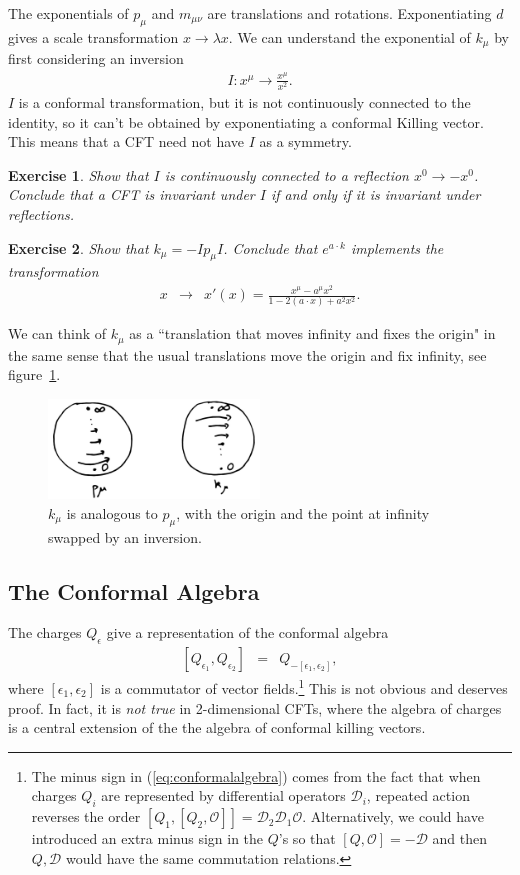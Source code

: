 \documentclass[11pt]{ws-rv9x6}
\newcommand\be{\begin{eqnarray}}
\newcommand\ee{\end{eqnarray}}
\newcommand\cO{\mathcal{O}}
\newcommand\e\epsilon
\newcommand\<\langle
\renewcommand\>\rangle
\renewcommand\.{\cdot}
\newcommand\cD{\mathcal{D}}
\newtheorem{exercise}{Exercise}[section]
\begin{document}
The exponentials of $p_\mu$ and $m_{\mu\nu}$ are translations and rotations. Exponentiating $d$ gives a scale transformation $x\to \lambda x$.  
We can understand the exponential of $k_\mu$ by first considering an inversion
\be
I:x^\mu \to \frac{x^\mu}{x^2}.
\ee
$I$ is a conformal transformation, but it is not continuously connected to the identity, so it can't be obtained by exponentiating a conformal Killing vector. This means that a CFT need not have $I$ as a symmetry.
\begin{exercise}
Show that $I$ is continuously connected to a reflection $x^0\to -x^0$.  Conclude that a CFT is invariant under $I$ if and only if it is invariant under reflections.
\end{exercise}

\begin{exercise}
Show that $k_\mu = -I p_\mu I$. Conclude that $e^{a\.k}$ implements the transformation
\be
\label{eq:finitespecialconformal}
x &\to& x'(x)=\frac{x^\mu-a^\mu x^2}{1-2(a\.x)+a^2 x^2}.
\ee
\end{exercise}
We can think of $k_\mu$ as a ``translation that moves infinity and fixes the origin" in the same sense that the usual translations move the origin and fix infinity, see figure~\ref{fig:translationnearinfinity}.

\begin{figure}
\begin{center}
\includegraphics[width=0.5\textwidth]{translationnearinfinity.jpg}
\end{center}
\caption{\label{fig:translationnearinfinity} $k_\mu$ is analogous to $p_\mu$, with the origin and the point at infinity swapped by an inversion.}
\end{figure}

\subsection{The Conformal Algebra}

The charges $Q_\e$ give a representation of the conformal algebra
\be
\label{eq:conformalalgebra}
[Q_{\e_1},Q_{\e_2}] &=& Q_{-[\e_1,\e_2]},
\ee
where $[\e_1,\e_2]$ is a commutator of vector fields.\footnote{The minus sign in (\ref{eq:conformalalgebra}) comes from the fact that when charges $Q_i$ are represented by differential operators $\cD_i$, repeated action reverses the order $[Q_1,[Q_2,\cO]]=\cD_2 \cD_1 \cO$.  Alternatively, we could have introduced an extra minus sign in the $Q$'s so that $[Q,\cO]=-\cD$ and then $Q,\cD$ would have the same commutation relations.}  This is not obvious and deserves proof. In fact, it is {\it not true\/} in 2-dimensional CFTs, where the algebra of charges is a central extension of the the algebra of conformal killing vectors.
\end{document}
